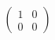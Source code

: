 \documentclass[preview]{standalone}
\begin{document}
\begin{align*}
\begin{pmatrix} 1 & 0 \\ 0 & 0 \end{pmatrix}
\end{align*}
\end{document}
